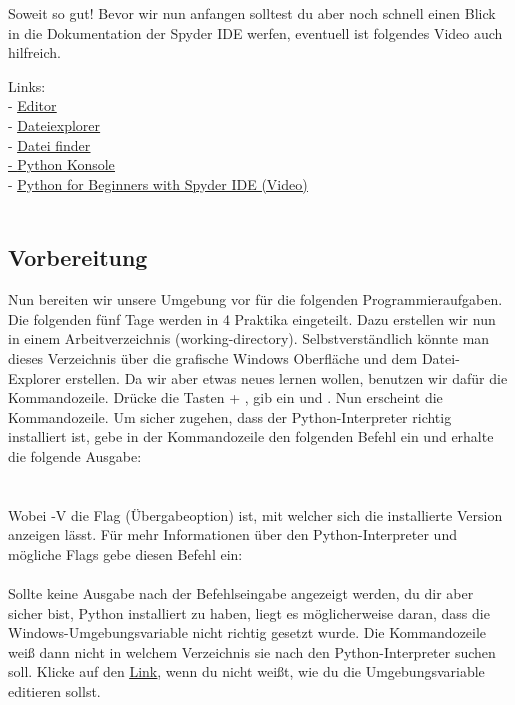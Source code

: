 Soweit so gut! Bevor wir nun anfangen solltest du aber noch schnell einen Blick in die Dokumentation der Spyder IDE werfen, eventuell ist folgendes Video auch hilfreich.

Links:\\
	- \underline{\href{https://docs.spyder-ide.org/editor.html}{Editor}}\\
	- \underline{\href{https://docs.spyder-ide.org/fileexplorer.html}{Dateiexplorer}}\\
	- \underline{\href{https://docs.spyder-ide.org/findinfiles.html}{Datei finder}\\
	- \href{https://docs.spyder-ide.org/ipythonconsole.html}{Python Konsole}}\\
	- \underline{\href{https://www.youtube.com/watch?v=BdATXeUkKnw}{Python for Beginners with Spyder IDE (Video)
}}\\
\\
\subsection{Vorbereitung}
Nun bereiten wir unsere Umgebung vor für die folgenden Programmieraufgaben. Die folgenden fünf Tage werden in 4 Praktika eingeteilt. Dazu erstellen wir nun in einem Arbeitverzeichnis (working-directory). Selbstverständlich könnte man dieses Verzeichnis über die grafische Windows Oberfläche und dem Datei-Explorer erstellen. Da wir aber etwas neues lernen wollen, benutzen wir dafür die Kommandozeile. Drücke die Tasten  + , gib  ein und . Nun erscheint die Kommandozeile. Um sicher zugehen, dass der Python-Interpreter richtig installiert ist, gebe in der Kommandozeile den folgenden Befehl ein und erhalte die folgende Ausgabe:\\

\\
\\

Wobei {-V} die Flag (Übergabeoption) ist, mit welcher sich die installierte Version anzeigen lässt. Für mehr Informationen über den Python-Interpreter und mögliche Flags gebe diesen Befehl ein:\\

\\

Sollte keine Ausgabe nach der Befehlseingabe angezeigt werden, du dir aber sicher bist, Python installiert zu haben, liegt es möglicherweise daran, dass die Windows-Umgebungsvariable  nicht richtig gesetzt wurde. Die Kommandozeile weiß dann nicht in welchem Verzeichnis sie nach den Python-Interpreter suchen soll. Klicke auf den \underline{\href{http://techmixx.de/windows-10-umgebungsvariablen-bearbeiten/}{Link}}, wenn du nicht weißt, wie du die Umgebungsvariable editieren sollst.

